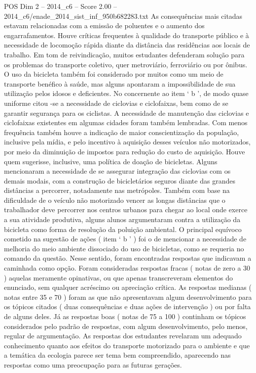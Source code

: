 \begin{textsample}{POS Dim 2 – 2014\_c6 – Score 2.00 – 2014\_c6/enade\_2014\_sist\_inf\_950b682283.txt}
As consequências mais citadas estavam relacionadas com a emissão de poluentes e o aumento dos engarrafamentos.
Houve críticas frequentes à qualidade do transporte público e à necessidade de locomoção rápida diante da distância das residências aos locais de trabalho.
Em tom de reivindicação, muitos estudantes defenderam solução para os problemas do transporte coletivo, quer metroviário, ferroviário ou por ônibus.
O uso da bicicleta também foi considerado por muitos como um meio de transporte benéfico à saúde, mas alguns apontaram a impossibilidade de sua utilização pelos idosos e deficientes.
No concernente ao item ‘ b ’, de modo quase uniforme citou -se a necessidade de ciclovias e ciclofaixas, bem como de se garantir segurança para os ciclistas.
A necessidade de manutenção das ciclovias e ciclofaixas existentes em algumas cidades foram também lembradas.
Com menos frequência também houve a indicação de maior conscientização da população, inclusive pela mídia, e pelo incentivo à aquisição desses veículos não motorizados, por meio da diminuição de impostos para redução do custo de aquisição.
Houve quem sugerisse, inclusive, uma política de doação de bicicletas.
Alguns mencionaram a necessidade de se assegurar integração das ciclovias com os demais modais, com a construção de bicicletários seguros diante das grandes distâncias a percorrer, notadamente nas metrópoles.
Também com base na dificuldade de o veículo não motorizado vencer as longas distâncias que o trabalhador deve percorrer nos centros urbanos para chegar ao local onde exerce a sua atividade produtiva, alguns alunos argumentaram contra a utilização da bicicleta como forma de resolução da poluição ambiental.
O principal equívoco cometido na sugestão de ações ( item ‘ b ’ ) foi o de mencionar a necessidade de melhoria do meio ambiente dissociado do uso de bicicletas, como se requeria no comando da questão.
Nesse sentido, foram encontradas respostas que indicavam a caminhada como opção.
Foram consideradas respostas fracas ( notas de zero a 30 ) aquelas meramente opinativas, ou que apenas transcreveram elementos do enunciado, sem qualquer acréscimo ou apreciação crítica.
As respostas medianas ( notas entre 35 e 70 ) foram as que não apresentavam algum desenvolvimento para os tópicos citados ( duas consequências e duas ações de intervenção ) ou por falta de alguns deles.
Já as respostas boas ( notas de 75 a 100 ) continham os tópicos considerados pelo padrão de respostas, com algum desenvolvimento, pelo menos, regular de argumentação.
As respostas dos estudantes revelaram um adequado conhecimento quanto aos efeitos do transporte motorizado para o ambiente e que a temática da ecologia parece ser tema bem compreendido, aparecendo nas respostas como uma preocupação para as futuras gerações.

\end{textsample}
